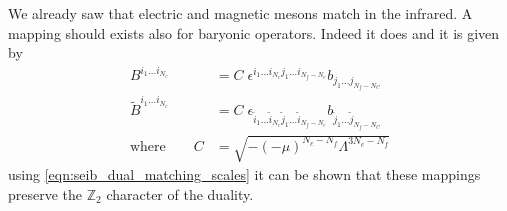 We already saw that electric and magnetic mesons match in the infrared. 
A mapping should exists also for baryonic operators. Indeed it does and it is given by
\begin{align}
 B^{i_1 \dots i_{N_c}} & = C \; \epsilon^{i_1 \dots i_{N_c} j_1 \dots i_{N_f - N_c}} b_{j_1 \dots j_{N_f - N_C}}\\
 \tilde{B}^{i_1 \dots i_{N_c}} &= C \; \epsilon_{\tilde{i}_1 \dots \tilde{i}_{N_c} \tilde{j}_1 \dots \tilde{i}_{N_f - N_c}} b_{ \tilde{j}_1 \dots \tilde{j}_{N_f - N_C}}\\
 \text{where} \qquad C & = \sqrt{ - (-\mu)^{N_c - N_f} \Lambda^{3 N_c - N_f}}
\end{align}
using \eqref{eqn:seib_dual_matching_scales} it can be shown that these mappings preserve the $\mathbb{Z}_2$ character of the duality. 

